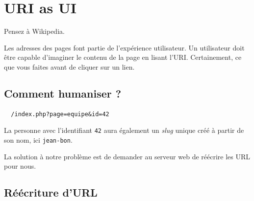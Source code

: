 \hypertarget{uri-as-ui}{%
\section{URI as UI}\label{uri-as-ui}}

Pensez à Wikipedia.

Les adresses des pages font partie de l'expérience utilisateur. Un
utilisateur doit être capable d'imaginer le contenu de la page en lisant
l'URI. Certainement, ce que vous faites avant de cliquer sur un lien.

\hypertarget{comment-humaniser}{%
\subsection{Comment humaniser ?}\label{comment-humaniser}}

\begin{english}

\begin{verbatim}
  /index.php?page=equipe&id=42
\end{verbatim}

\end{english}

La personne avec l'identifiant \textenglish{\texttt{42}} aura également
un \emph{slug} unique créé à partir de son nom, ici
\textenglish{\texttt{jean-bon}}.

La solution à notre problème est de demander au serveur web de réécrire
les URL pour nous.

\hypertarget{ruxe9uxe9criture-durl}{%
\subsection{Réécriture d'URL}\label{ruxe9uxe9criture-durl}}

\begin{english}

\begin{Shaded}
\begin{Highlighting}[]

\CharTok{ }

\end{Highlighting}
\end{Shaded}

\end{english}

